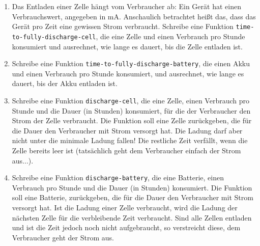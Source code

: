 \begin{aufgabe}
\begin{enumerate}
  \item Das Entladen einer Zelle hängt vom Verbraucher ab: Ein Gerät
    hat einen Verbrauchswert, angegeben in mA.  Anschaulich betrachtet
    heißt das, dass das Gerät pro Zeit eine gewissen Strom verbraucht.
    Schreibe eine Funktion \texttt{time-to-fully-discharge-cell},
    die eine Zelle und einen Verbrauch pro Stunde konsumiert und
    ausrechnet, wie lange es dauert, bis die Zelle entladen ist.

  \item Schreibe eine Funktion
    \texttt{time-to-fully-discharge-battery}, die einen Akku und einen
    Verbrauch pro Stunde konsumiert, und ausrechnet, wie lange es
    dauert, bis der Akku entladen ist.

  \item Schreibe eine Funktion \texttt{discharge-cell}, die eine
    Zelle, einen Verbrauch pro Stunde und die Dauer (in Stunden)
    konsumiert, für die der Verbraucher den Strom der Zelle
    verbraucht.  Die Funktion soll eine Zelle zurückgeben, die für die
    Dauer den Verbraucher mit Strom versorgt hat.  Die Ladung darf
    aber nicht unter die minimale Ladung fallen! Die restliche Zeit
    verfällt, wenn die Zelle bereits leer ist (tatsächlich geht dem
    Verbraucher einfach der Strom aus...).

  \item Schreibe eine Funktion \texttt{discharge-battery}, die
    eine Batterie, einen Verbrauch pro Stunde und die Dauer (in
    Stunden) konsumiert.  Die Funktion soll eine Batterie,
    zurückgeben, die für die Dauer den Verbraucher mit Strom versorgt
    hat.  Ist die Ladung einer Zelle verbraucht, wird die Ladung der
    nächsten Zelle für die verbleibende Zeit verbraucht.  Sind alle
    Zellen entladen und ist die Zeit jedoch noch nicht aufgebraucht,
    so verstreicht diese, dem Verbraucher geht der Strom aus.

  \end{enumerate}
  
\end{aufgabe}

